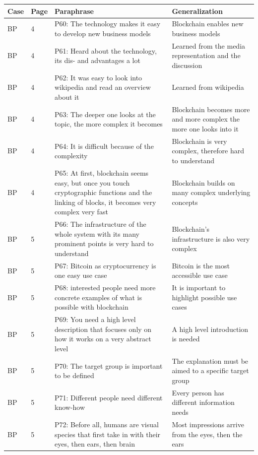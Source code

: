 \begin{table}[H]
    \centering
    \begin{tabularx}{\textwidth}{ll|X|p{4.5cm}}
    Case & Page & Paraphrase & Generalization  \\ \hline
	BP & 4 & P60: The technology makes it easy to develop new business models & Blockchain enables new business models   \\ 
	BP & 4 & P61: Heard about the technology, its dis- and advantages a lot  & Learned from the media representation and the discussion   \\ 
	BP & 4 & P62: It was easy to look into wikipedia and read an overview about it & Learned from wikipedia   \\ 
	BP & 4 & P63: The deeper one looks at the topic, the more complex it becomes & Blockchain becomes more and more complex the more one looks into it   \\ 
	BP & 4 & P64: It is difficult because of the complexity & Blockchain is very complex, therefore hard to understand   \\ 
	BP & 4 & P65: At first, blockchain seems easy, but once you touch cryptographic functions and the linking of blocks, it becomes very complex very fast & Blockchain builds on many complex underlying concepts   \\ 
	BP & 5 & P66: The infrastructure of the whole system with its many prominent points is very hard to understand & Blockchain's infrastructure is also very complex   \\ 
	BP & 5 & P67: Bitcoin as cryptocurrency is one easy use case & Bitcoin is the most accessible use case   \\ 
	BP & 5 & P68: interested people need more concrete examples of what is possible with blockchain & It is important to highlight possible use cases   \\ 
	BP & 5 & P69: You need a high level description that focuses only on how it works on a very abstract level & A high level introduction is needed   \\ 
	BP & 5 & P70: The target group is important to be defined & The explanation must be aimed to a specific target group    \\ 
	BP & 5 & P71: Different people need different know-how & Every person has different information needs   \\ 
	BP & 5 & P72: Before all, humans are visual species that first take in with their eyes, then ears, then brain & Most impressions arrive from the eyes, then the ears   \\ 

\end{tabularx}
\end{table}
